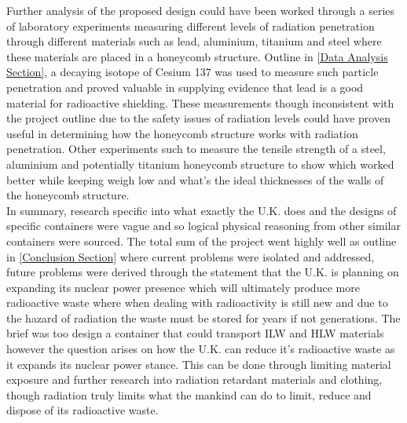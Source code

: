 Further analysis of the proposed design could have been worked through a series of laboratory experiments measuring different levels of radiation penetration through different materials such as lead, aluminium, titanium and steel where these materials are placed in a honeycomb structure. Outline in \cref{Data Analysis Section}, a decaying isotope of Cesium 137 was used to measure such particle penetration and proved valuable in supplying evidence that lead is a good material for radioactive shielding. These measurements though inconsistent with the project outline due to the safety issues of radiation levels could have proven useful in determining how the honeycomb structure works with radiation penetration. Other experiments such to measure the tensile strength of a steel, aluminium and potentially titanium honeycomb structure to show which worked better while keeping weigh low and what's the ideal thicknesses of the walls of the honeycomb structure. \\
\newpage
In summary, research specific into what exactly the U.K. does and the designs of specific containers were vague and so logical physical reasoning from other similar containers were sourced. The total sum of the project went highly well as outline in \cref{Conclusion Section} where current problems were isolated and addressed, future problems were derived through the statement that the U.K. is planning on expanding its nuclear power presence which will ultimately produce more radioactive waste where when dealing with radioactivity is still new and due to the hazard of radiation the waste must be stored for years if not generations. The brief was too design a container that could transport ILW and HLW materials however the question arises on how the U.K. can reduce it's radioactive waste as it expands its nuclear power stance. This can be done through limiting material exposure and further research into radiation retardant materials and clothing, though radiation truly limits what the mankind can do to limit, reduce and dispose of its radioactive waste.